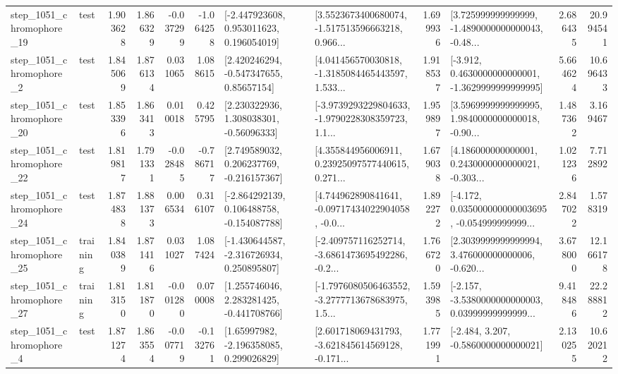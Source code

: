 \begin{tabular}{llrrrrllrlrr}
 step\_1051\_chromophore\_19 &      test &      1.903628 &    1.866329 &     -0.037299 & -1.064258 &    [-2.447923608, 0.953011623, 0.196054019] &  [3.5523673400680074, -1.517513596663218, 0.966... &       1.699936 &  [3.725999999999999, -1.4890000000000043, -0.48... &            2.686435 &         20.994541 \\
  step\_1051\_chromophore\_2 &      test &      1.845069 &    1.876134 &      0.031065 &  1.088615 &     [2.420246294, -0.547347655, 0.85657154] &  [4.041456570030818, -1.3185084465443597, 1.533... &       1.918537 &  [-3.912, 0.4630000000000001, -1.3629999999999995] &            5.664624 &         10.696433 \\
 step\_1051\_chromophore\_20 &      test &      1.853396 &    1.863413 &      0.010018 &  0.425795 &     [2.230322936, 1.308038301, -0.56096333] &  [-3.9739293229804633, -1.9790228308359723, 1.1... &       1.959897 &  [3.5969999999999995, 1.9840000000000018, -0.90... &            1.487362 &          3.169467 \\
 step\_1051\_chromophore\_22 &      test &      1.819817 &    1.791331 &     -0.028485 & -0.786717 &    [2.749589032, 0.206237769, -0.216157367] &  [4.355844956006911, 0.23925097577440615, 0.271... &       1.679038 &  [4.186000000000001, 0.2430000000000021, -0.303... &            1.021236 &          7.712892 \\
 step\_1051\_chromophore\_24 &      test &      1.874838 &    1.881373 &      0.006534 &  0.316107 &   [-2.864292139, 0.106488758, -0.154087788] &  [4.744962890841641, -0.09717434022904058, -0.0... &       1.892272 &  [-4.172, 0.035000000000003695, -0.054999999999... &            2.847022 &          1.578319 \\
 step\_1051\_chromophore\_25 &  training &      1.840389 &    1.871416 &      0.031027 &  1.087424 &   [-1.430644587, -2.316726934, 0.250895807] &  [-2.409757116252714, -3.6861473695492286, -0.2... &       1.766720 &  [2.3039999999999994, 3.476000000000006, -0.620... &            3.678000 &         12.166178 \\
 step\_1051\_chromophore\_27 &  training &      1.813150 &    1.811870 &     -0.001280 &  0.070008 &    [1.255746046, 2.283281425, -0.441708766] &  [-1.7976080506463552, -3.2777713678683975, 1.5... &       1.593985 &  [-2.157, -3.5380000000000003, 0.03999999999999... &            9.418486 &         22.288812 \\
  step\_1051\_chromophore\_4 &      test &      1.871274 &    1.863554 &     -0.007719 & -0.132761 &     [1.65997982, -2.196358085, 0.299026829] &  [2.601718069431793, -3.621845614569128, -0.171... &       1.771991 &               [-2.484, 3.207, -0.5860000000000021] &            2.130255 &         10.620212 \\

\end{tabular}
